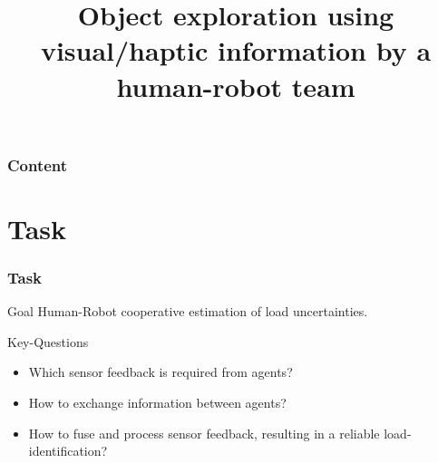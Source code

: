 \documentclass[student,noshadow]{ITRslides}
\title{Object exploration using visual/haptic information by a human-robot team}
\begin{document}
\begin{frame}
    \titlepage
\end{frame}

\begin{frame}
	\frametitle{Content}
	\tableofcontents
\end{frame}

\section{Task}
\begin{frame}
	\frametitle{Task}
	\begin{block}{Goal}
			Human-Robot cooperative estimation of load uncertainties.
	\end{block}
	\vspace{2mm}
	\begin{block}{Key-Questions}
			\begin{itemize}
				\item Which sensor feedback is required from agents?
				\item How to exchange information between agents?
				\item How to fuse and process sensor feedback, resulting in a reliable load-identification?
			\end{itemize}	   
	\end{block}	
\end{frame}
\end{document}
